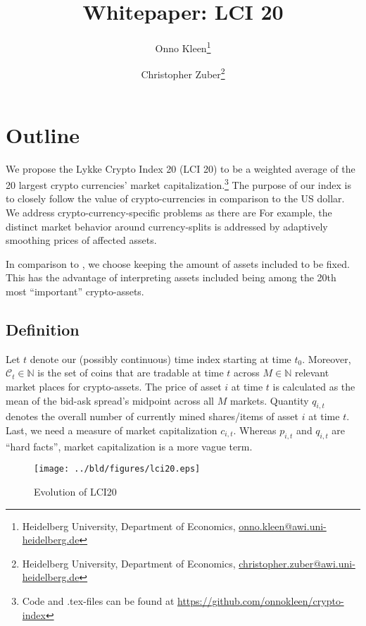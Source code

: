 \documentclass[11pt]{article}
\title{Whitepaper: LCI 20}
\author{
Onno Kleen\thanks{Heidelberg University, Department of Economics, \href{mailto:onno.kleen@awi.uni-heidelberg.de}{onno.kleen@awi.uni-heidelberg.de}}
\and
Christopher Zuber\thanks{Heidelberg University, Department of Economics, \href{mailto:christopher.zuber@awi.uni-heidelberg.de}{christopher.zuber@awi.uni-heidelberg.de}}
}
\begin{document}
\maketitle
\section{Outline}

We propose the Lykke Crypto Index 20 (LCI 20) to be a weighted average of the 20 largest crypto currencies' market capitalization.\footnote{Code and .tex-files can be found at \href{https://github.com/onnokleen/crypto-index}{https://github.com/onnokleen/crypto-index}}
The purpose of our index is to closely follow the value of crypto-currencies in comparison to the US dollar.
We address crypto-currency-specific problems as there are
For example, the distinct market behavior around currency-splits is addressed by adaptively smoothing prices of affected assets.

In comparison to \cite{Trimborn2016}, we choose keeping the amount of assets included to be fixed.
This has the advantage of interpreting assets included being among the 20th most ``important'' crypto-assets.

\subsection{Definition}

Let $t$ denote our (possibly continuous) time index starting at time $t_0$.
Moreover, $\mathcal{C}_t \in \mathbb{N}$ is the set of coins that are tradable at time $t$ across $M \in \mathbb{N}$ relevant market places for crypto-assets.
The price of asset $i$ at time $t$ is calculated as the mean of the bid-ask spread's midpoint across all $M$ markets.
Quantity $q_{i,t}$ denotes the overall number of currently mined shares/items of asset $i$ at time $t$.
Last, we need a measure of market capitalization $c_{i,t}$.
Whereas $p_{i,t}$ and $q_{i,t}$ are ``hard facts'', market capitalization is a more vague term.

\begin{figure}%
    \centering%
    \texttt{[image: ../bld/figures/lci20.eps]}%
    \caption{Evolution of LCI20}\label{f:lci20}%
\end{figure}
\end{document}
